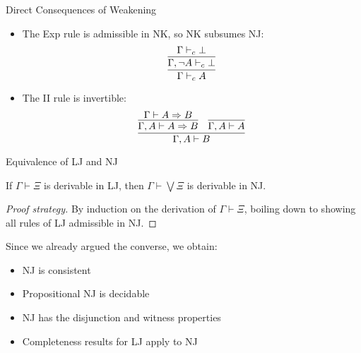 \documentclass[xcolor=dvipsnames,aspectratio=169,handout]{beamer}
\begin{document}
\begin{frame}{Direct Consequences of Weakening}
	\begin{itemize}
		\pause
		\item
		The Exp rule is admissible in NK, so NK subsumes NJ:
		$$
		\infer{\Gamma\vdash_c A}{
		\infer{\Gamma,\neg A \vdash_c \bot}{\Gamma \vdash_c \bot}
		}
		$$
		\vspace{0.3cm}
		\pause
		\item
		The II rule is invertible:
		$$
		\infer{\Gamma,A\vdash B}{
		\infer{\Gamma,A\vdash A\to B}{\Gamma\vdash A\to B}
		&
		\infer{\Gamma,A\vdash A}{}
		}
		$$
	\end{itemize}
\end{frame}

\begin{frame}{Equivalence of LJ and NJ}
	\begin{theorem}
		If $\Gamma\vdash \Xi$ is derivable in LJ, then $\Gamma\vdash \bigvee \Xi$ is derivable in NJ.
	\end{theorem}
	\pause
	\begin{proof}[Proof strategy]
		By induction on the derivation of $\Gamma\vdash \Xi$, boiling down to showing all rules of LJ admissible in NJ.
	\end{proof}
	
	\pause
	\vspace{0.5cm}
	Since we already argued the converse, we obtain:
	\begin{itemize}
		\item
		NJ is consistent
		\item
		Propositional NJ is decidable
		\item
		NJ has the disjunction and witness properties
		\item
		Completeness results for LJ apply to NJ
	\end{itemize}
\end{frame}
\end{document}
